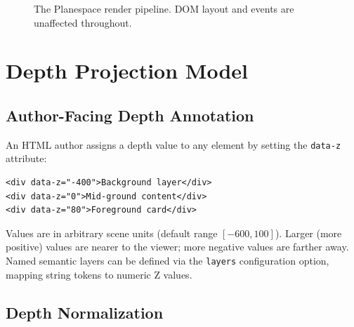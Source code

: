 \documentclass[10pt,twocolumn]{article}
\begin{document}
\begin{figure}[h]
\centering
{}
\caption{The Planespace render pipeline. DOM layout and events are
unaffected throughout.}
\label{fig:pipeline}
\end{figure}

\section{Depth Projection Model}
\label{sec:depth}

\subsection{Author-Facing Depth Annotation}

An HTML author assigns a depth value to any element by setting the
\texttt{data-z} attribute:

\begin{lstlisting}[style=js,caption={Depth annotation in HTML.},numbers=none]
<div data-z="-400">Background layer</div>
<div data-z="0">Mid-ground content</div>
<div data-z="80">Foreground card</div>
\end{lstlisting}

Values are in arbitrary scene units (default range $[-600, 100]$). Larger
(more positive) values are nearer to the viewer; more negative values are
farther away. Named semantic layers can be defined via the \texttt{layers}
configuration option, mapping string tokens to numeric Z values.

\subsection{Depth Normalization}
\end{document}
